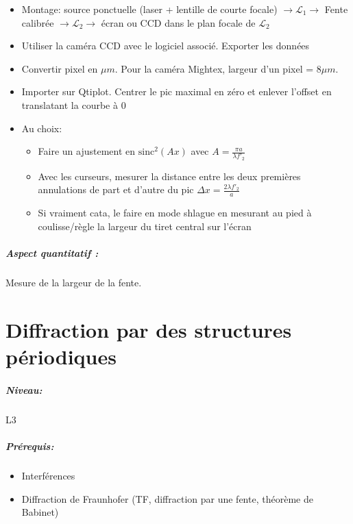 \documentclass[11pt]{report}
\numberwithin{figure}{section}
\numberwithin{equation}{section}
\numberwithin{table}{section}
\newcommand{\1}{\boldsymbol{1}}
\begin{document}
\begin{tcolorbox}[breakable, enhanced, colback=red!2!white,colframe=mycolor!85!black,title=\textbf{\textbf{Expérience}}]
\begin{itemize}[label=$\triangleright$]
		\item Montage: source ponctuelle (laser + lentille de courte focale) $\rightarrow \mathcal{L}_1 \rightarrow $ Fente calibrée $\rightarrow \mathcal{L}_2 \rightarrow$ écran ou CCD dans le plan focale de $\mathcal{L}_2$
		\item Utiliser la caméra CCD avec le logiciel associé. Exporter les données
		\item Convertir pixel en $\mu 
		m$. Pour la caméra Mightex, largeur d'un pixel = $8 \mu m$.
		\item Importer sur Qtiplot. Centrer le pic maximal en zéro et enlever l'offset en translatant la courbe à $0$
		\item Au choix:
		\begin{itemize}
		\item Faire un ajustement en $\mathrm{sinc}^2(Ax)$ avec $A = \frac{\pi a}{\lambda f'_2}$
		\item Avec les curseurs, mesurer la distance entre les deux premières annulations de part et d'autre du pic $\Delta x = \frac{2 \lambda f'_2}{a}$
		\item Si vraiment cata, le faire en mode shlague en mesurant au pied à coulisse/règle la largeur du tiret central sur l'écran
		\end{itemize}
\end{itemize}

\paragraph*{Aspect quantitatif :} Mesure de la largeur de la fente.


\end{tcolorbox}



\newpage



\chapter{Diffraction par des structures périodiques}


\paragraph*{Niveau:} L3
\paragraph*{Prérequis:} 
\begin{itemize}
\item Interférences
\item Diffraction de Fraunhofer (TF, diffraction par une fente, théorème de Babinet)
\end{itemize}
\end{document}
